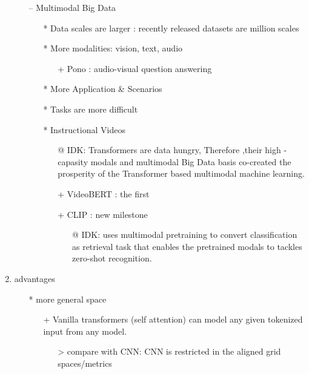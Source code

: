 \documentclass{article}
\begin{document}
\begin{enumerate}
\begin{itemize}
\begin{itemize}
\begin{itemize}
						\end{itemize}
				\end{itemize}
			\item[--] Multimodal Big Data
			\begin{itemize}
				\item[*] Data scales are larger : recently released datasets are million scales
				\item[*] More modalities: vision, text, audio
					\begin{itemize}
						\item[+] Pono : audio-visual question answering
					\end{itemize}
				\item[*] More Application \& Scenarios
				\item[*] Tasks are more difficult
				\item[*] Instructional Videos
					\begin{itemize}
						\item[@] IDK: Transformers are data hungry, Therefore ,their high -capasity modals and multimodal Big Data basis co-created the prosperity of the Transformer based multimodal machine learning. 
					\end{itemize}
					\begin{itemize}
						\item[+] VideoBERT : the first
						\item[+] CLIP : new milestone 
						\begin{itemize}
							\item[@] IDK: uses multimodal pretraining to convert classification as retrieval task that enables the pretrained modals to tackles zero-shot recognition.
						\end{itemize}
					\end{itemize}
			\end{itemize}
		\end{itemize}
		\item advantages
				\begin{itemize}
				\item[*] more general space
					\begin{itemize}
						\item[+] Vanilla transformers (self attention) can model any given tokenized input from any model.
						\begin{itemize}
							\item[>] compare with CNN: CNN is restricted in the aligned grid spaces/metrics
						\end{itemize}
					\end{itemize}
			

\end{itemize}
\end{enumerate}
\end{document}
